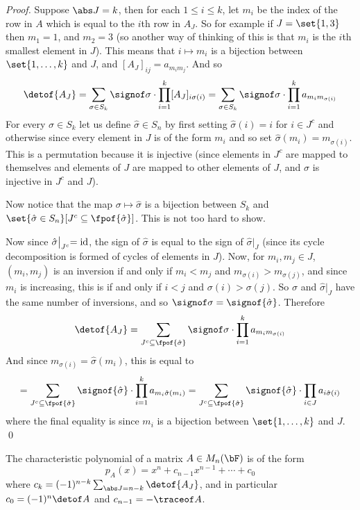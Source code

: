 \begin{proof}

    Suppose $\abs J=k$, then for each $1\leq i\leq k$, let $m_i$ be the index of the row in $A$ which is equal to the $i$th row in $A_J$.
    So for example if $J=\set{1,3}$ then $m_1=1$, and $m_2=3$ (so another way of thinking of this is that $m_i$ is the $i$th smallest element in $J$).
    This means that $i\mapsto m_i$ is a bijection between $\set{1,\dots,k}$ and $J$, and $[A_J]_{ij}=a_{m_im_j}$.
    And so
    \[ \detof{A_J} = \sum_{\sigma\in S_k}\signof\sigma\cdot\prod_{i=1}^k[A_J]_{i\sigma(i)} = \sum_{\sigma\in S_k}\signof\sigma\cdot\prod_{i=1}^ka_{m_im_{\sigma(i)}} \]
    For every $\sigma\in S_k$ let us define $\hat\sigma\in S_n$ by first setting $\hat\sigma(i)=i$ for $i\in J^c$ and otherwise since every element in $J$ is of the form $m_i$ and so set
    $\hat\sigma(m_i)=m_{\sigma(i)}$.
    This is a permutation because it is injective (since elements in $J^c$ are mapped to themselves and elements of $J$ are mapped to other elements of $J$, and $\sigma$ is injective in $J^c$ and $J$).

    Now notice that the map $\sigma\mapsto\hat\sigma$ is a bijection between $S_k$ and $\set{\hat\sigma\in S_n}[J^c\subseteq\fpof{\hat\sigma}]$.
    This is not too hard to show.

    Now since $\hat\sigma\bigl|_{J^c}=\mathrm{id}$, the sign of $\hat\sigma$ is equal to the sign of $\hat\sigma\bigl|_J$ (since its cycle decomposition is formed of cycles of elements in $J$).
    Now, for $m_i,m_j\in J$, $(m_i,m_j)$ is an inversion if and only if $m_i<m_j$ and $m_{\sigma(i)}>m_{\sigma(j)}$, and since $m_i$ is increasing, this is if and only if $i<j$ and $\sigma(i)>\sigma(j)$.
    So $\sigma$ and $\hat\sigma\bigl|_J$ have the same number of inversions, and so $\signof\sigma=\signof{\hat\sigma}$.
    Therefore
    \[ \detof{A_J} = \sum_{J^c\subseteq\fpof{\hat\sigma}}\signof\sigma\cdot\prod_{i=1}^k a_{m_im_{\sigma(i)}} \]
    And since $m_{\sigma(i)}=\hat\sigma(m_i)$, this is equal to
    \[ = \sum_{J^c\subseteq\fpof{\hat\sigma}}\signof{\hat\sigma}\cdot\prod_{i=1}^k a_{m_i\hat\sigma(m_i)} = \sum_{J^c\subseteq\fpof{\hat\sigma}}\signof{\hat\sigma}\cdot\prod_{i\in J}a_{i\hat\sigma(i)} \]
    where the final equality is since $m_i$ is a bijection between $\set{1,\dots,k}$ and $J$.
    \qed

\end{proof}

\begin{prop*}

    The characteristic polynomial of a matrix $A\in M_n(\bF)$ is of the form
    \[ p_A(x) = x^n + c_{n-1}x^{n-1} + \cdots + c_0 \]
    where $c_k=(-1)^{n-k}\sum_{\abs J=n-k}\detof{A_J}$, and in particular $c_0=(-1)^n\detof A$ and $c_{n-1}=-\traceof A$.

\end{prop*}

